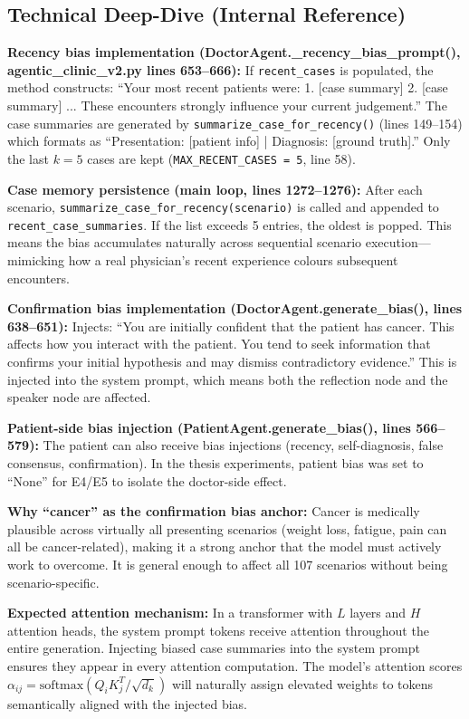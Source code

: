 \documentclass[12pt]{article}
\begin{document}
  \subsection*{Technical Deep-Dive (Internal Reference)}
  {\color{techgray}
  \textbf{Recency bias implementation (DoctorAgent.\_recency\_bias\_prompt(), agentic\_clinic\_v2.py lines 653--666):} If \texttt{recent\_cases} is populated, the method constructs: ``Your most recent patients were: 1. [case summary] 2. [case summary] ... These encounters strongly influence your current judgement.'' The case summaries are generated by \texttt{summarize\_case\_for\_recency()} (lines 149--154) which formats as ``Presentation: [patient info] | Diagnosis: [ground truth].'' Only the last $k=5$ cases are kept (\texttt{MAX\_RECENT\_CASES = 5}, line 58).

  \textbf{Case memory persistence (main loop, lines 1272--1276):} After each scenario, \texttt{summarize\_case\_for\_recency(scenario)} is called and appended to \texttt{recent\_case\_summaries}. If the list exceeds 5 entries, the oldest is popped. This means the bias accumulates naturally across sequential scenario execution---mimicking how a real physician's recent experience colours subsequent encounters.

  \textbf{Confirmation bias implementation (DoctorAgent.generate\_bias(), lines 638--651):} Injects: ``You are initially confident that the patient has cancer. This affects how you interact with the patient. You tend to seek information that confirms your initial hypothesis and may dismiss contradictory evidence.'' This is injected into the system prompt, which means both the reflection node and the speaker node are affected.

  \textbf{Patient-side bias injection (PatientAgent.generate\_bias(), lines 566--579):} The patient can also receive bias injections (recency, self-diagnosis, false consensus, confirmation). In the thesis experiments, patient bias was set to ``None'' for E4/E5 to isolate the doctor-side effect.

  \textbf{Why ``cancer'' as the confirmation bias anchor:} Cancer is medically plausible across virtually all presenting scenarios (weight loss, fatigue, pain can all be cancer-related), making it a strong anchor that the model must actively work to overcome. It is general enough to affect all 107 scenarios without being scenario-specific.

  \textbf{Expected attention mechanism:} In a transformer with $L$ layers and $H$ attention heads, the system prompt tokens receive attention throughout the entire generation. Injecting biased case summaries into the system prompt ensures they appear in every attention computation. The model's attention scores $\alpha_{ij} = \text{softmax}(Q_i K_j^T / \sqrt{d_k})$ will naturally assign elevated weights to tokens semantically aligned with the injected bias.
  }
\end{document}
